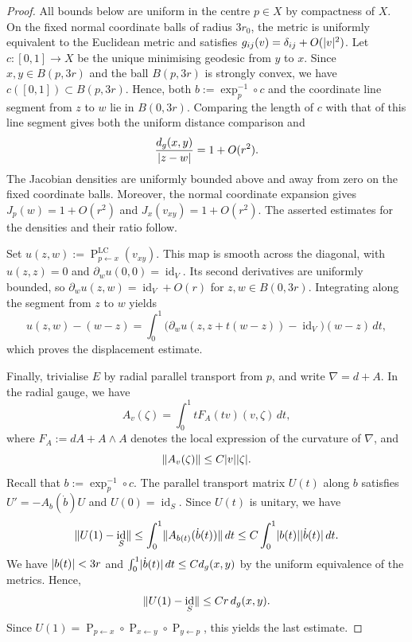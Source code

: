 \documentclass[a4paper,oneside,12pt]{amsart}
\theoremstyle{plain}
\theoremstyle{definition}
\theoremstyle{remark}
\DeclarePairedDelimiter{\abs}{\lvert}{\rvert}
\DeclarePairedDelimiter{\norm}{\lVert}{\rVert}
\DeclareMathOperator{\id}{id}
\newcommand{\paralleltransport}[2]{\operatorname{P}_{#2 \gets #1}}
\newcommand{\paralleltransportLC}[2]{\paralleltransport{#1}{#2}^{\mathrm{LC}}}
\begin{document}
\begin{proof}
  All bounds below are uniform in the centre $p \in X$ by compactness of $X$.
  On the fixed normal coordinate balls of radius $3r_0$, the metric is uniformly equivalent to the Euclidean metric and satisfies $g_{ij}(v) = \delta_{ij} + O(\abs{v}^2)$.
  Let $c \colon [0,1] \to X$ be the unique minimising geodesic from $y$ to $x$.
  Since $x, y \in B(p,3r)$ and the ball $B(p,3r)$ is strongly convex, we have $c([0,1]) \subset B(p,3r)$.
  Hence, both $b := \exp_p^{-1} \circ c$ and the coordinate line segment from $z$ to $w$ lie in $B(0,3r)$.
  Comparing the length of $c$ with that of this line segment gives both the uniform distance comparison and
  \begin{equation}
    \frac{d_g(x,y)}{\abs{z-w}}=1+O(r^2).
  \end{equation}
  The Jacobian densities are uniformly bounded above and away from zero on the fixed coordinate balls.
  Moreover, the normal coordinate expansion gives $J_p(w)=1+O(r^2)$ and $J_x(v_{xy})=1+O(r^2)$.
  The asserted estimates for the densities and their ratio follow.

  Set $u(z,w) := \paralleltransportLC{x}{p}(v_{xy})$.
  This map is smooth across the diagonal, with $u(z,z)=0$ and $\partial_w u(0,0)=\id_V$.
  Its second derivatives are uniformly bounded, so $\partial_w u(z,w) = \id_V + O(r)$ for $z,w\in B(0,3r)$.
  Integrating along the segment from $z$ to $w$ yields
  \begin{equation}
    u(z,w)-(w-z) = \int_0^1 \big( \partial_w u(z,z+t(w-z)) - \id_V \big)(w-z) \,dt,
  \end{equation}
  which proves the displacement estimate.

  Finally, trivialise $E$ by radial parallel transport from $p$, and write $\nabla=d+A$.
  In the radial gauge, we have
  \begin{equation}
    A_v(\zeta) = \int_0^1 tF_A(tv)(v,\zeta) \,dt,
  \end{equation}
  where $F_A := dA + A \wedge A$ denotes the local expression of the curvature of $\nabla$, and
  \begin{equation}
    \norm{A_v(\zeta)} \le C\abs{v}\abs{\zeta}.
  \end{equation}
  Recall that $b:=\exp_p^{-1} \circ c$.
  The parallel transport matrix $U(t)$ along $b$ satisfies $U' = -A_b(\dot{b})U$ and $U(0)=\id_S$.
  Since $U(t)$ is unitary, we have
  \begin{equation}
    \norm{U(1)-\id_S} \le \int_0^1 \norm{A_{b(t)}(\dot b(t))} \,dt \le C\int_0^1 \abs{b(t)} \abs{\dot b(t)} \,dt .
  \end{equation}
  We have $\abs{b(t)} < 3r$ and $\int_0^1 \abs{\dot b(t)} \,dt \le C d_g(x,y)$ by the uniform equivalence of the metrics.
  Hence,
  \begin{equation}
    \norm{U(1)-\id_S} \le C r\, d_g(x,y).
  \end{equation}
  Since $U(1)=\paralleltransport{x}{p} \circ \paralleltransport{y}{x} \circ \paralleltransport{p}{y}$, this yields the last estimate.
\end{proof}
\end{document}
